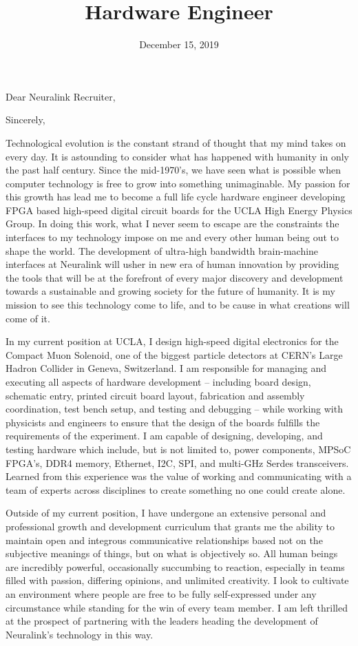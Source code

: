 \documentclass[11pt,a4paper,sans]{moderncv}        %
\title{Hardware Engineer}                               %
\begin{document}
\date{December 15, 2019}
\opening{Dear Neuralink Recruiter,}
\closing{Sincerely,}
\makelettertitle

Technological evolution is the constant strand of thought that my mind takes on every day. It is astounding to consider what has happened with humanity in only the past half century. Since the mid-1970's, we have seen what is possible when computer technology is free to grow into something unimaginable. My passion for this growth has lead me to become a full life cycle hardware engineer developing FPGA based high-speed digital circuit boards for the UCLA High Energy Physics Group. In doing this work, what I never seem to escape are the constraints the interfaces to my technology impose on me and every other human being out to shape the world. The development of ultra-high bandwidth brain-machine interfaces at Neuralink will usher in new era of human innovation by providing the tools that will be at the forefront of every major discovery and development towards a sustainable and growing society for the future of humanity. It is my mission to see this technology come to life, and to be cause in what creations will come of it.

In my current position at UCLA, I design high-speed digital electronics for the Compact Muon Solenoid, one of the biggest particle detectors at CERN's Large Hadron Collider in Geneva, Switzerland. I am responsible for managing and executing all aspects of hardware development -- including board design, schematic entry, printed circuit board layout, fabrication and assembly coordination, test bench setup, and testing and debugging -- while working with physicists and engineers to ensure that the design of the boards fulfills the requirements of the experiment. I am capable of designing, developing, and testing hardware which include, but is not limited to, power components, MPSoC FPGA's, DDR4 memory, Ethernet, I2C, SPI, and multi-GHz Serdes transceivers. Learned from this experience was the value of working and communicating with a team of experts across disciplines to create something no one could create alone.

Outside of my current position, I have undergone an extensive personal and professional growth and development curriculum that grants me the ability to maintain open and integrous communicative relationships based not on the subjective meanings of things, but on what is objectively so. All human beings are incredibly powerful, occasionally succumbing to reaction, especially in teams filled with passion, differing opinions, and unlimited creativity. I look to cultivate an environment where people are free to be fully self-expressed under any circumstance while standing for the win of every team member. I am left thrilled at the prospect of partnering with the leaders heading the development of Neuralink's technology in this way.
\end{document}
